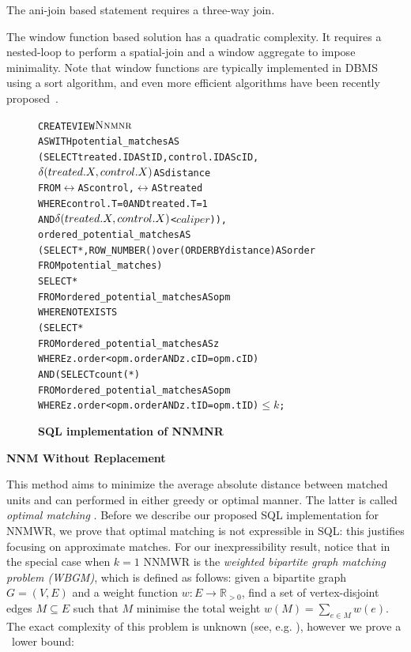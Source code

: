 {{The ani-join based statement requires a three-way join.  The window function based
solution has a quadratic complexity. It requires a nested-loop to
perform a spatial-join and a window aggregate to impose
minimality. Note that window functions are typically implemented in
DBMS using a sort algorithm, and even more efficient algorithms have
been recently proposed~\cite{Neumann15}.






\begin{figure}
  \centering
\begin{alltt} \scriptsize
CREATE VIEW \(\nnmnr\)
AS WITH potential_matches AS
  (SELECT treated.ID AS tID, control.ID AS cID,
          \(\delta(treated.\cv,control.\cv)\)  AS distance
   FROM \(\rel\) AS control, \(\rel\) AS treated
   WHERE control.T=0 AND treated.T=1
     AND \(\delta(treated.\cv,control.\cv)\) < \(caliper\))),
            ordered_potential_matches AS
  (SELECT *, ROW_NUMBER() over (ORDER BY distance) AS order
   FROM potential_matches)
SELECT *
FROM ordered_potential_matches AS opm
WHERE NOT EXISTS
    (SELECT *
     FROM ordered_potential_matches AS z
     WHERE z.order < opm.order AND z.cID=opm.cID)
  AND (SELECT count(*)
     FROM ordered_potential_matches AS opm
     WHERE z.order < opm.order AND z.tID=opm.tID)\( \leq k\);
\end{alltt} \vspace{-.5cm}
  \caption{\bf SQL implementation of NNMNR}\label{fig:nnmnr}
\end{figure}


{\bf NNM Without Replacement}  This method aims
to minimize the average absolute distance between matched units and can performed in either greedy or optimal manner. The latter is called {\em optimal matching}
\cite{Rosenbaum93}. Before we describe our proposed SQL implementation for NNMWR, we prove
that optimal matching is not expressible in SQL: this justifies
focusing on approximate matches.  For our inexpressibility result,
notice that in the special case when $k=1$ NNMWR is the {\em weighted
  bipartite graph matching problem (WBGM)}, which is defined as
follows: given a bipartite graph $G=(V,E)$ and a weight function
$w: E \rightarrow \mathbb{R}_{>0}$, find a set of vertex-disjoint
edges $M \subseteq E$ such that $M$ minimise the total weight
$w(M) = \sum_{e \in M} w(e)$.  The exact complexity of this problem
is unknown (see, e.g. \cite{Avis83}), however we prove a \NLOGSPACE\
lower bound:

}}
